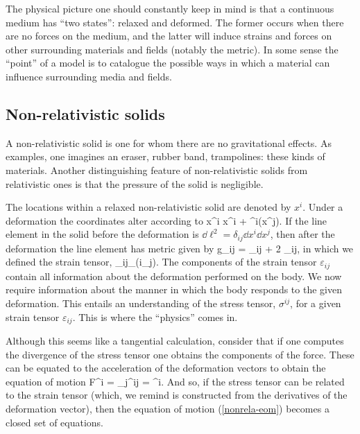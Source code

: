 The physical picture one should constantly keep in mind is that a continuous medium has ``two states'': relaxed and deformed. The former occurs when there are no forces on the medium, and the latter will induce strains and forces on other surrounding materials and fields (notably the metric). In some sense the ``point'' of a model is to catalogue the possible ways in which a material can influence surrounding media and fields. 



\subsection{Non-relativistic solids}
A non-relativistic solid is one for whom there are no gravitational effects. As examples, one imagines an eraser, rubber band, trampolines: these kinds of materials. Another distinguishing feature of non-relativistic solids from relativistic ones is that the pressure of the solid is negligible.

The locations within a relaxed non-relativistic solid are denoted by $x^i$. Under a deformation the coordinates alter according to 
\bea
x^i \longrightarrow x^i + \xi^i(x^j).
\eea
 If the line element in the solid before the deformation is $\dd\ell^2 = \delta_{ij} \dd x^i \dd x^j$, then after the deformation the line element has metric  given by
\bea
g_{ij} = \delta_{ij} + 2 \varepsilon_{ij},
\eea
in which we defined the strain tensor,
\bea
\label{non-rel-strain-defn}
\varepsilon_{ij} \partial_{(i}\xi_{j)}.
\eea
The components of the strain tensor $\varepsilon_{ij}$ contain all information about the deformation performed on the body. We now require information about the manner in which the body responds to the given deformation. This   entails   an understanding of the stress tensor, $\sigma^{ij}$, for a given strain tensor $\varepsilon_{ij}$. This is where the ``physics'' comes in.

Although this seems like a tangential calculation, consider that if one computes the divergence of the stress tensor one obtains the components of the force. These can be equated to the acceleration of the deformation vectors to obtain the equation of motion
\bea
\label{nonrela-eom}
F^i = \partial_j\sigma^{ij} = \rho \ddot{\xi}^i.
\eea
And so, if the stress tensor can be related to the strain tensor (which, we remind is constructed from the derivatives of the deformation vector), then the equation of motion (\ref{nonrela-eom}) becomes a closed set of equations.

